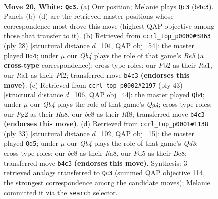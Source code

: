 \documentclass[11pt]{article}
\begin{document}
\clearpage

\begin{figure}[p]\centering
\begin{subfigure}{0.46\textwidth}\centering
\resizebox{\linewidth}{!}{%
\newchessgame
\chessboard[
  setfen={rnb1k2r/2q1b3/3p4/p2PppN1/1QB3p1/8/PPP2PP1/R1B1RK2 w kq - 0 20},
  showmover=false,
  pgfstyle=straightmove, color=movearrow, markmove={b4-c3}
]}
\caption{}
\end{subfigure}\hfill
\begin{subfigure}{0.46\textwidth}\centering
\resizebox{\linewidth}{!}{%
\newchessgame
\chessboard[
  setfen={r2q1knr/ppp2pp1/3b4/3PB2p/2B4P/1Q6/P4PP1/R4K1R w - - 2 15},
  showmover=false,
  pgfstyle=straightmove, color=movearrow, markmove={e5-d4}
]}
\caption{}
\end{subfigure}
\\[4pt]
\begin{subfigure}{0.46\textwidth}\centering
\resizebox{\linewidth}{!}{%
\newchessgame
\chessboard[
  setfen={r1b2rk1/pp4pp/4p3/4PnqP/4Bp2/8/PPQ2PP1/R1BR2K1 b - - 0 22},
  showmover=false,
  pgfstyle=straightmove, color=movearrow, markmove={g5-h4}
]}
\caption{}
\end{subfigure}\hfill
\begin{subfigure}{0.46\textwidth}\centering
\resizebox{\linewidth}{!}{%
\newchessgame
\chessboard[
  setfen={r1b2rk1/pp3ppp/2pq4/2b3B1/3NR3/2P5/PP1Q1PPP/R5K1 b - - 0 17},
  showmover=false,
  pgfstyle=straightmove, color=movearrow, markmove={d6-d5}
]}
\caption{}
\end{subfigure}
\caption{\textbf{Move 20, White: \texttt{Qc3}.} (a) Our position; Melanie plays \texttt{Qc3} (\texttt{b4c3}). Panels (b)--(d) are the retrieved master positions whose correspondence most drove this move (highest QAP objective among those that transfer to it). (b) Retrieved from \texttt{ccrl\_top\_p0000\#3863} (ply 28) [structural distance $d$=104, QAP obj=54]: the master played \texttt{Bd4}; under $\mu$ our \emph{Qb4} plays the role of that game's \emph{Be5} (a \textbf{cross-type} correspondence); cross-type roles: our \emph{P}b2 as their \emph{R}a1, our \emph{R}a1 as their \emph{P}f2; transferred move \texttt{b4c3} \textbf{(endorses this move)}. (c) Retrieved from \texttt{ccrl\_top\_p0002\#2197} (ply 43) [structural distance $d$=106, QAP obj=44]: the master played \texttt{Qh4}; under $\mu$ our \emph{Qb4} plays the role of that game's \emph{Qg4}; cross-type roles: our \emph{P}g2 as their \emph{R}a8, our \emph{b}c8 as their \emph{R}f8; transferred move \texttt{b4c3} \textbf{(endorses this move)}. (d) Retrieved from \texttt{ccrl\_top\_p0001\#1138} (ply 33) [structural distance $d$=102, QAP obj=15]: the master played \texttt{Qd5}; under $\mu$ our \emph{Qb4} plays the role of that game's \emph{Qd3}; cross-type roles: our \emph{b}c8 as their \emph{R}a8, our \emph{P}d5 as their \emph{B}c8; transferred move \texttt{b4c3} \textbf{(endorses this move)}. Synthesis: 3 retrieved analogs transferred to \texttt{Qc3} (summed QAP objective 114, the strongest correspondence among the candidate moves); Melanie committed it via the \texttt{search} selector.}
\label{fig:thought-m38}
\end{figure}
\end{document}
